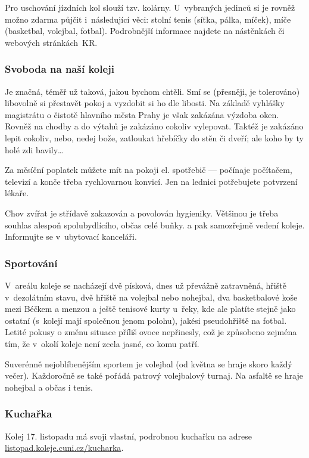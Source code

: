Pro uschování jízdních kol slouží tzv.
kolárny. U~vybraných jedinců si je rovněž možno zdarma půjčit
i~následující věci: stolní tenis (síťka, pálka, míček), míče
(basketbal, volejbal, fotbal). Podrobnější informace najdete na
nástěnkách či webových stránkách~KR.

\subsubsection{Svoboda na naší koleji}

Je značná, téměř už taková, jakou bychom chtěli. Smí se (přesněji,
je tolerováno) libovolně si přestavět pokoj a vyzdobit si ho dle
libosti. Na základě vyhlášky magistrátu o čistotě hlavního města
Prahy je však zakázána výzdoba oken. Rovněž na chodby a do výtahů
je zakázáno cokoliv vylepovat. Taktéž je zakázáno lepit cokoliv,
nebo, nedej bože, zatloukat hřebíčky do stěn či dveří; ale koho by
ty holé zdi bavily\dots

Za měsíční poplatek můžete mít na pokoji el. spotřebič ---  počínaje
počítačem, televizí a konče třeba rychlovarnou konvicí. Jen na
lednici potřebujete potvrzení lékaře.

Chov zvířat je střídavě zakazován a povolován hygieniky. Většinou
je třeba souhlas alespoň spolubydlícího, občas celé buňky. a pak
samozřejmě vedení koleje. Informujte se v~ubytovací kanceláři.

\subsubsection{Sportování}

V~areálu koleje se nacházejí dvě písková, dnes už převážně
zatravněná, hřiště v~de\-zo\-lát\-ním stavu, dvě hřiště na volejbal nebo
nohejbal, dva basketbalové koše mezi Béčkem a menzou a ještě
tenisové kurty u~řeky, kde ale platíte stejně jako ostatní
(s~kolejí mají společnou jenom polohu), jakési pseudohřiště na
fotbal. Letité pokusy o změnu situace příliš ovoce nepřinesly, což
je způsobeno zejména tím, že v~okolí koleje není zcela jasné, co
komu patří.

Suverénně nejoblíbenějším sportem je volejbal (od května se hraje
skoro každý večer). Každoročně se také pořádá patrový volejbalový
turnaj. Na asfaltě se hraje nohejbal a občas i tenis.

\subsubsection{Kuchařka}
Kolej 17. listopadu má svoji vlastní, podrobnou kuchařku na adrese \url{listopad.koleje.cuni.cz/kucharka}.